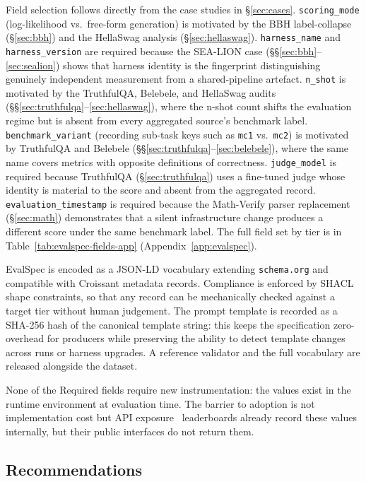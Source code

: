 \documentclass[11pt]{article}
\begin{document}
Field selection follows directly from the case studies in
\S\ref{sec:cases}. \texttt{scoring\_mode} (log-likelihood vs.\ free-form
generation) is motivated by the BBH label-collapse (\S\ref{sec:bbh}) and
the HellaSwag analysis (\S\ref{sec:hellaswag}). \texttt{harness\_name}
and \texttt{harness\_version} are required because the SEA-LION case
(\S\S\ref{sec:bbh}--\ref{sec:sealion}) shows that harness identity is
the fingerprint distinguishing genuinely independent measurement from a
shared-pipeline artefact. \texttt{n\_shot} is motivated by the TruthfulQA,
Belebele, and HellaSwag audits
(\S\S\ref{sec:truthfulqa}--\ref{sec:hellaswag}), where the n-shot count
shifts the evaluation regime but is absent from every aggregated source's
benchmark label. \texttt{benchmark\_variant} (recording sub-task keys such
as \texttt{mc1} vs.\ \texttt{mc2}) is motivated by TruthfulQA and Belebele
(\S\S\ref{sec:truthfulqa}--\ref{sec:belebele}), where the same name covers
metrics with opposite definitions of correctness. \texttt{judge\_model} is
required because TruthfulQA (\S\ref{sec:truthfulqa}) uses a fine-tuned
judge whose identity is material to the score and absent from the
aggregated record. \texttt{evaluation\_timestamp} is required because the
Math-Verify parser replacement (\S\ref{sec:math}) demonstrates that a
silent infrastructure change produces a different score under the same
benchmark label. The full field set by tier is in
Table~\ref{tab:evalspec-fields-app} (Appendix~\ref{app:evalspec}).

EvalSpec is encoded as a JSON-LD vocabulary extending \texttt{schema.org}
and compatible with Croissant metadata records. Compliance is enforced by
SHACL shape constraints, so that any record can be mechanically checked
against a target tier without human judgement. The prompt template is
recorded as a SHA-256 hash of the canonical template string: this keeps the
specification zero-overhead for producers while preserving the ability to
detect template changes across runs or harness upgrades. A reference
validator and the full vocabulary are released alongside the dataset.

None of the Required fields require new instrumentation: the values exist
in the runtime environment at evaluation time. The barrier to adoption is
not implementation cost but API exposure~ leaderboards already record
these values internally, but their public interfaces do not return them.


\subsection{Recommendations}
\end{document}
